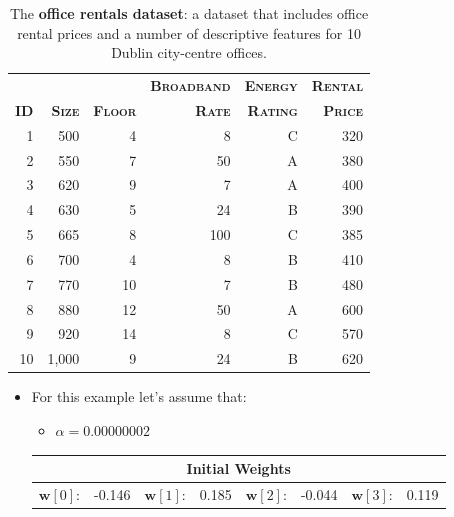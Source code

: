 \documentclass[xcolor={table}]{beamer}
\newcommand{\featN}[1]{\textsc{#1}}
\begin{document}
 \begin{frame} 
\begin{table}
	\caption{The \textbf{office rentals dataset}: a dataset that includes office rental prices and a number of descriptive features for 10 Dublin city-centre offices.}
	\centering
	\begin{footnotesize}
	\begin{tabular}{r r r r r r }
		\hline
				\textbf{}	 & \textbf{}	 & \textbf{} & \textbf{\featN{Broadband}} & \textbf{\featN{Energy}} & \textbf{\featN{Rental}} \\
		\textbf{\featN{ID}}	 & \textbf{\featN{Size}}	 & \textbf{\featN{Floor}} & \textbf{\featN{Rate}} & \textbf{\featN{Rating}} & \textbf{\featN{Price}} \\
		\hline
1 & 500	&	4	&	8	&	C	&	320	\\
2 & 550	&	7	&	50	&	A	&	380	\\
3 & 620	&	9	&	7	&	A	&	400	\\
4 & 630	&	5	&	24	&	B	&	390	\\
5 & 665	&	8	&	100	&	C	&	385	\\
6 & 700	&	4	&	8	&	B	&	410	\\
7 & 770	&	10	&	7	&	B	&	480	\\
8 & 880	&	12	&	50	&	A	&	600	\\
9 & 920	&	14	&	8	&	C	&	570	\\
10 & 1,000	&	9	&	24	&	B	&	620	\\
		\hline
	\end{tabular}
	\end{footnotesize}
\label{tab:officeSizesAndPrices}
\end{table}
\end{frame} 

\begin{frame}
\begin{itemize}
\item For this example let's assume that:
	\begin{itemize}
		\item $\alpha = 0.00000002$ 
	\end{itemize}
	\begin{footnotesize}
		\begin{tabular}{c c c c c c c c}
			\multicolumn{8}{c}{\textbf{Initial Weights}} \\
			\hline
			$\mathbf{w}[0]$: &	-0.146	& 	$\mathbf{w}[1]$:	&	0.185	 & $\mathbf{w}[2]$: &	-0.044	 & $\mathbf{w}[3]$: &	0.119 \\
			\hline
	\end{tabular}
	\end{footnotesize}
\end{itemize}
\end{frame}
\end{document}
